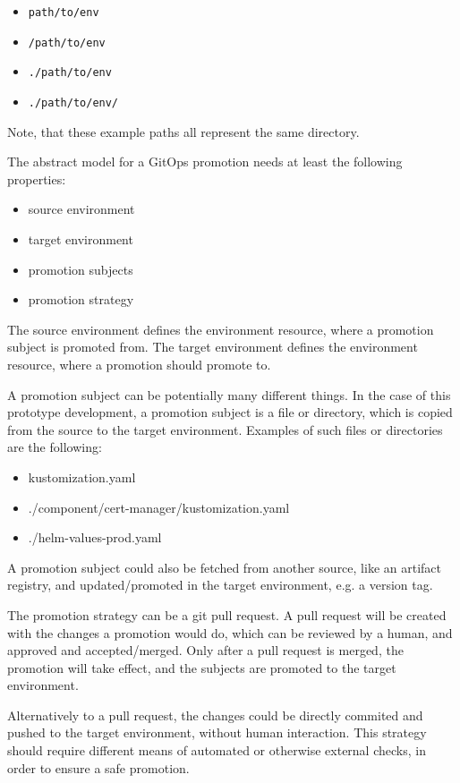 \begin{itemize}
	\item \verb*|path/to/env|
	\item \verb*|/path/to/env|
	\item \verb*|./path/to/env|
	\item \verb*|./path/to/env/|
\end{itemize}

Note, that these example paths all represent the same directory.

The abstract model for a GitOps promotion needs at least the following properties:

\begin{itemize}
	\item source environment
	\item target environment
	\item promotion subjects
	\item promotion strategy
\end{itemize}

The source environment defines the environment resource,
where a promotion subject is promoted from.
The target environment defines the environment resource,
where a promotion should promote to.

A promotion subject can be potentially many different things.
In the case of this prototype development,
a promotion subject is a file or directory,
which is copied from the source to the target environment.
Examples of such files or directories are the following:

\begin{itemize}
	\item kustomization.yaml
	\item ./component/cert-manager/kustomization.yaml
	\item ./helm-values-prod.yaml
\end{itemize}

A promotion subject could also be fetched from another source,
like an artifact registry,
and updated/promoted in the target environment,
e.g. a version tag.

The promotion strategy can be a git pull request.
A pull request will be created with the changes a promotion would do, 
which can be reviewed by a human,
and approved and accepted/merged.
Only after a pull request is merged,
the promotion will take effect, and the subjects are promoted to the target environment.

Alternatively to a pull request, the changes could be directly
commited and pushed to the target environment,
without human interaction. This strategy should require different means
of automated or otherwise external checks, in order to ensure a safe promotion.

